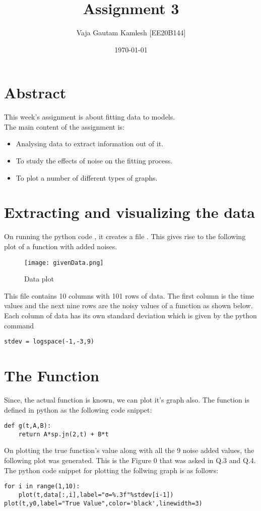 \documentclass[11pt, a4paper]{article}
\title{Assignment 3} %
\author{Vaja Gautam Kamlesh [EE20B144]} %
\date{\today} %
\begin{document}
	
		
\maketitle %
\section*{Abstract}
This week's assignment is about fitting data to models.\\
The main content of the assignment is: 
\begin{itemize}
\item Analysing data to extract information out of it.
\item To study the effects of noise on the fitting process.
\item To plot a number of different types of graphs. 
\end{itemize}

\section{Extracting and visualizing the data}
On running the python code \textit{}, it creates a file \textit{}. This gives rise to the following plot of a function with added noises.

   \begin{figure}[!tbh]
   	\centering
   	\texttt{[image: givenData.png]}   
   	\caption{Data plot}
   \end{figure} 
   This file contains 10 columns with 101 rows of data. The first column is the time values and the next nine rows are the noisy values of a function as shown below. Each column of data has its own standard deviation which is given by the python command
\begin{verbatim}	
stdev = logspace(-1,-3,9)
\end{verbatim}
\section{The Function}
Since, the actual function is known, we can plot it's graph also. The function is defined in python as the following code snippet:
\begin{verbatim}	
def g(t,A,B):
    return A*sp.jn(2,t) + B*t
\end{verbatim}

On plotting the true function's value along with all the 9 noise added values, the following plot was generated. This is the Figure 0 that was asked in Q.3 and Q.4. The python code snippet for plotting the follwing graph is as follows:
\begin{verbatim}	
for i in range(1,10):
    plot(t,data[:,i],label="σ=%.3f"%stdev[i-1])
plot(t,y0,label="True Value",color='black',linewidth=3)	
\end{verbatim}
\end{document}
